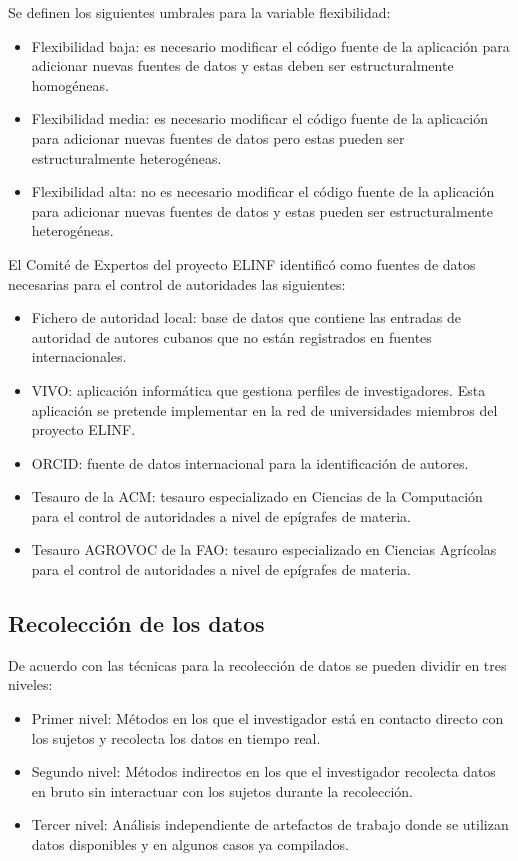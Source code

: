 Se definen los siguientes umbrales para la variable flexibilidad:

\begin{itemize}
\item Flexibilidad baja: es necesario modificar el código fuente de la aplicación para adicionar nuevas fuentes de datos y estas deben ser estructuralmente homogéneas.
\item Flexibilidad media: es necesario modificar el código fuente de la aplicación para adicionar nuevas fuentes de datos pero estas pueden ser estructuralmente heterogéneas.
\item Flexibilidad alta: no es necesario modificar el código fuente de la aplicación para adicionar nuevas fuentes de datos y estas pueden ser estructuralmente heterogéneas.
\end{itemize}

El Comité de Expertos del proyecto ELINF identificó como fuentes de datos necesarias para el control de autoridades las siguientes:

\begin{itemize}
\item Fichero de autoridad local: base de datos que contiene las entradas de autoridad de autores cubanos que no están registrados en fuentes internacionales.
\item VIVO: aplicación informática que gestiona perfiles de investigadores. Esta aplicación se pretende implementar en la red de universidades miembros del proyecto ELINF.
\item ORCID: fuente de datos internacional para la identificación de autores.
\item Tesauro de la ACM: tesauro especializado en Ciencias de la Computación para el control de autoridades a nivel de epígrafes de materia.
\item Tesauro AGROVOC de la FAO: tesauro especializado en Ciencias Agrícolas para el control de autoridades a nivel de epígrafes de materia.
\end{itemize}

\subsection{Recolección de los datos}

De acuerdo con \cite{Lethbridge2005} las técnicas para la recolección de datos se pueden dividir en tres niveles:

\begin{itemize}
\item Primer nivel: Métodos en los que el investigador está en contacto directo con los sujetos y recolecta los datos en tiempo real. 
\item Segundo nivel: Métodos indirectos en los que el investigador recolecta datos en bruto sin interactuar con los sujetos durante la recolección.
\item Tercer nivel: Análisis independiente de artefactos de trabajo donde se utilizan datos disponibles y en algunos casos ya compilados.
\end{itemize}

